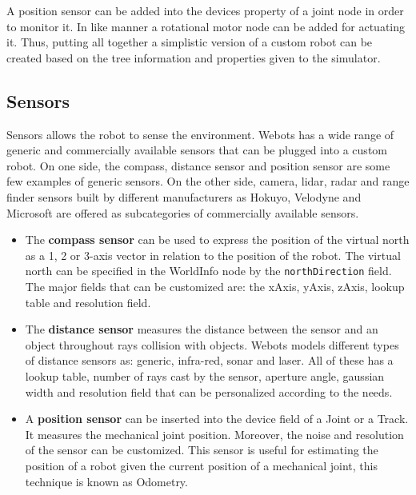 A position sensor can be added into the devices property of a joint node in order to monitor it. In like manner a rotational motor node can be added for actuating it. Thus, putting all together a simplistic version of a custom robot can be created based on the tree information and properties given to the simulator.

\subsection{Sensors}

Sensors allows the robot to sense the environment. Webots has a wide range of generic and commercially available sensors that can be plugged into a custom robot. On one side, the compass, distance sensor and position sensor are some few examples of generic sensors. On the other side, camera, lidar, radar and range finder sensors built by different manufacturers as Hokuyo, Velodyne and Microsoft are offered as subcategories of commercially available sensors. 

\begin{itemize}
\item{The \textbf{compass sensor} can be used to express the position of the virtual north as a 1, 2 or 3-axis vector in relation to the position of the robot. The virtual north can be specified in the WorldInfo node by the \verb|northDirection| field. The major fields that can be customized are: the xAxis, yAxis, zAxis, lookup table and resolution field. }
\item{The \textbf{distance sensor} measures the distance between the sensor and an object throughout rays collision with objects. Webots models different types of distance sensors as: generic, infra-red, sonar and laser. All of these has a lookup table, number of rays cast by the sensor, aperture angle, gaussian width and resolution field that can be personalized according to the needs.}
\item{A \textbf{position sensor} can be inserted into the device field of a Joint or a Track. It measures the mechanical joint position. Moreover, the noise and resolution of the sensor can be customized. This sensor is useful for estimating the position of a robot given the current position of a mechanical joint, this technique is known as Odometry.}
\end{itemize}

